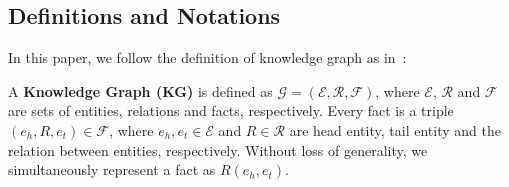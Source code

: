 \subsection{Definitions and Notations}

In this paper, we follow the definition of knowledge graph as in~\cite{ji2021survey}:
\begin{definitionnew}
A \textbf{Knowledge Graph (KG)} is defined as $\mathcal{G}=(\mathcal{E},\mathcal{R},\mathcal{F})$, where
$\mathcal{E}$, $\mathcal{R}$ and $\mathcal{F}$ are sets of entities, relations and facts, respectively.
Every fact is a triple $(e_h,R,e_t) \in \mathcal{F}$, where $e_h, e_t\in \mathcal{E}$ and $R \in \mathcal{R}$ are head entity, tail entity and the relation between entities, respectively. Without loss of generality, we simultaneously represent a fact as $R(e_h,e_t)$.
\end{definitionnew}







